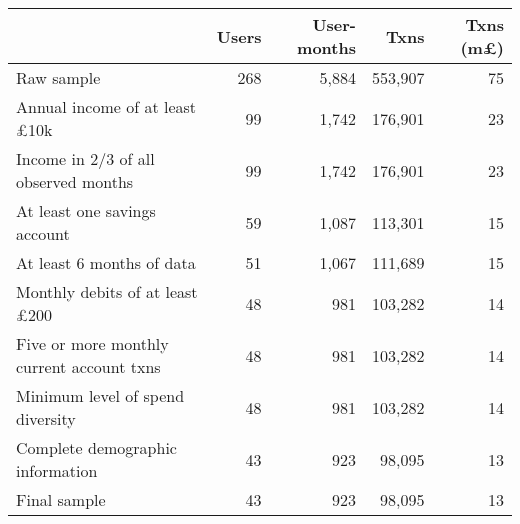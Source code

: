 \begin{tabular}{lrrrr}
\toprule
                                          & Users & User-months &    Txns & Txns (m\pounds) \\
\midrule
                               Raw sample &   268 &       5,884 & 553,907 &              75 \\
     Annual income of at least \pounds10k &    99 &       1,742 & 176,901 &              23 \\
     Income in 2/3 of all observed months &    99 &       1,742 & 176,901 &              23 \\
             At least one savings account &    59 &       1,087 & 113,301 &              15 \\
                At least 6 months of data &    51 &       1,067 & 111,689 &              15 \\
    Monthly debits of at least \pounds200 &    48 &         981 & 103,282 &              14 \\
Five or more monthly current account txns &    48 &         981 & 103,282 &              14 \\
         Minimum level of spend diversity &    48 &         981 & 103,282 &              14 \\
         Complete demographic information &    43 &         923 &  98,095 &              13 \\
                             Final sample &    43 &         923 &  98,095 &              13 \\
\bottomrule
\end{tabular}
